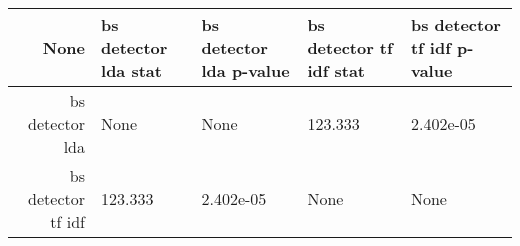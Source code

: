 \begin{tabular}{|r|l|l|l|l|}
  \hline
  None & bs detector lda stat & bs detector lda p-value & bs detector tf idf stat & bs detector tf idf p-value \\ 
  \hline
  bs detector lda & None & None & 123.333 & 2.402e-05 \\ 
  \hline
  bs detector tf idf & 123.333 & 2.402e-05 & None & None \\ 
  \hline
\end{tabular}
